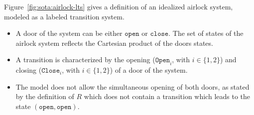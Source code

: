 \begin{example}
  \label{example:sota:airlocklts}
  Figure~\ref{fig:sota:airlock-lts} gives a definition of an idealized airlock
  system, modeled as a labeled transition system.

  \begin{itemize}
  \item A door of the system can be either \( \mathtt{open} \) or
    \( \mathtt{close} \).
    The set of states of the airlock system reflects the Cartesian product of
    the doors states.
  \item A transition is characterized by the opening (\( \mathtt{Open}_i\), with
    \( i \in \{1, 2\} \)) and closing (\( \mathtt{Close}_i \), with
    \( i \in \{1, 2\} \)) of a door of the system.
  \item The model does not allow the simultaneous opening of both doors, as
    stated by the definition of \( R \) which does not contain a transition
    which leads to the state \( (\mathtt{open}, \mathtt{open}) \).
  \end{itemize}
\end{example}

